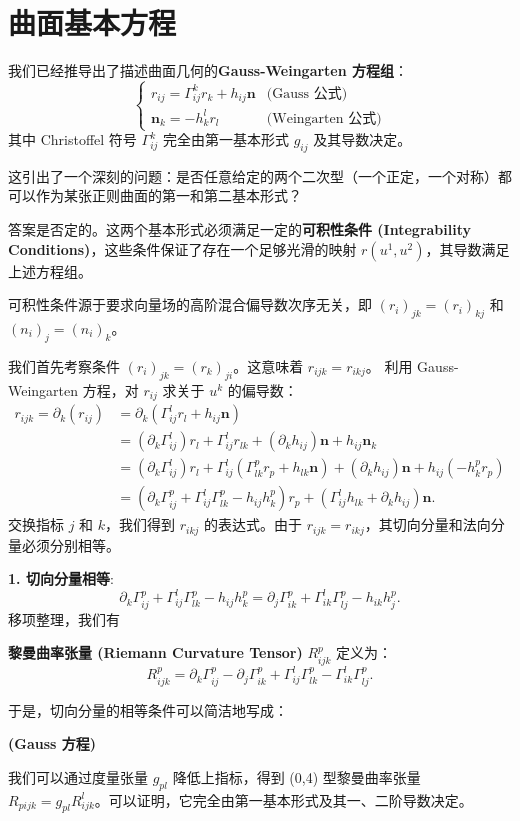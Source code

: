 \documentclass[lang=cn,10pt,thmcnt=section]{elegantbook}
\renewcommand{\vec}[1]{\mathbf{#1}}
\begin{document}
\section{曲面基本方程}
我们已经推导出了描述曲面几何的\textbf{Gauss-Weingarten 方程组}：
\[
\begin{cases}
    r_{ij} = \Gamma_{ij}^k r_k + h_{ij} \vec{n} & \text{(Gauss 公式)} \\
    \vec{n}_k = -h_k^l r_l & \text{(Weingarten 公式)}
\end{cases}
\]
其中 Christoffel 符号 $\Gamma_{ij}^k$ 完全由第一基本形式 $g_{ij}$ 及其导数决定。

这引出了一个深刻的问题：是否任意给定的两个二次型（一个正定，一个对称）都可以作为某张正则曲面的第一和第二基本形式？

答案是否定的。这两个基本形式必须满足一定的\textbf{可积性条件 (Integrability Conditions)}，这些条件保证了存在一个足够光滑的映射 $r(u^1, u^2)$，其导数满足上述方程组。


可积性条件源于要求向量场的高阶混合偏导数次序无关，即 $(r_i)_{jk} = (r_i)_{kj}$ 和 $(n_i)_j = (n_i)_k$。

我们首先考察条件 $(r_{i})_{jk} = (r_{k})_{ji}$。这意味着 $r_{ijk} = r_{ikj}$。
利用 Gauss-Weingarten 方程，对 $r_{ij}$ 求关于 $u^k$ 的偏导数：
\begin{align*}
    r_{ijk} = \partial_k (r_{ij}) &= \partial_k (\Gamma_{ij}^l r_l + h_{ij} \vec{n}) \\
    &= (\partial_k \Gamma_{ij}^l) r_l + \Gamma_{ij}^l r_{lk} + (\partial_k h_{ij}) \vec{n} + h_{ij} \vec{n}_k \\
    &= (\partial_k \Gamma_{ij}^l) r_l + \Gamma_{ij}^l (\Gamma_{lk}^p r_p + h_{lk}\vec{n}) + (\partial_k h_{ij}) \vec{n} + h_{ij} (-h_k^p r_p) \\
    &= (\partial_k \Gamma_{ij}^p + \Gamma_{ij}^l \Gamma_{lk}^p - h_{ij} h_k^p) r_p + (\Gamma_{ij}^l h_{lk} + \partial_k h_{ij}) \vec{n}.
\end{align*}
交换指标 $j$ 和 $k$，我们得到 $r_{ikj}$ 的表达式。由于 $r_{ijk} = r_{ikj}$，其切向分量和法向分量必须分别相等。

\textbf{1. 切向分量相等}:
\[
\partial_k \Gamma_{ij}^p + \Gamma_{ij}^l \Gamma_{lk}^p - h_{ij} h_k^p = \partial_j \Gamma_{ik}^p + \Gamma_{ik}^l \Gamma_{lj}^p - h_{ik} h_j^p.
\]
移项整理，我们有
\begin{definition}[黎曼曲率张量, (1,3)型]
    \textbf{黎曼曲率张量 (Riemann Curvature Tensor)} $R_{ijk}^p$ 定义为：
    \[
    R_{ijk}^p = \partial_k \Gamma_{ij}^p - \partial_j \Gamma_{ik}^p + \Gamma_{ij}^l \Gamma_{lk}^p - \Gamma_{ik}^l \Gamma_{lj}^p.
    \]
\end{definition}
于是，切向分量的相等条件可以简洁地写成：
\begin{center}
     \quad \textbf{(Gauss 方程)}
\end{center}
我们可以通过度量张量 $g_{pl}$ 降低上指标，得到 (0,4) 型黎曼曲率张量 $R_{pijk} = g_{pl} R_{ijk}^l$。可以证明，它完全由第一基本形式及其一、二阶导数决定。
\end{document}

